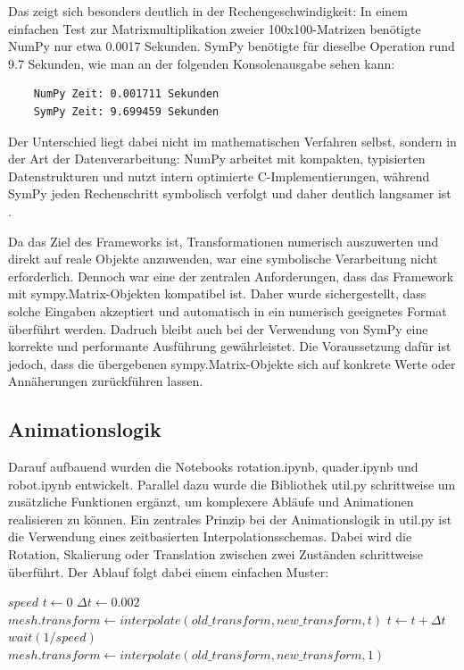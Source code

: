 Das zeigt sich besonders deutlich in der Rechengeschwindigkeit: In einem einfachen Test zur Matrixmultiplikation zweier 100x100-Matrizen benötigte NumPy nur etwa 0.0017
Sekunden. SymPy benötigte für dieselbe Operation rund 9.7 Sekunden, wie man an der folgenden Konsolenausgabe sehen kann:
\begin{center}
    \begin{verbatim}
    NumPy Zeit: 0.001711 Sekunden
    SymPy Zeit: 9.699459 Sekunden
    \end{verbatim}
\end{center}
Der Unterschied liegt dabei nicht im mathematischen Verfahren selbst,
sondern in der Art der Datenverarbeitung: NumPy arbeitet mit kompakten, typisierten Datenstrukturen und nutzt intern optimierte C-Implementierungen,
während SymPy jeden Rechenschritt symbolisch verfolgt und daher deutlich langsamer ist .

Da das Ziel des Frameworks ist, Transformationen numerisch auszuwerten und direkt auf reale Objekte anzuwenden,
war eine symbolische Verarbeitung nicht erforderlich. Dennoch war eine der zentralen Anforderungen, dass das Framework mit sympy.Matrix-Objekten kompatibel ist.
Daher wurde sichergestellt, dass solche Eingaben akzeptiert und automatisch in ein numerisch geeignetes Format überführt werden.
Dadruch bleibt auch bei der Verwendung von SymPy eine korrekte und performante Ausführung gewährleistet. Die Voraussetzung dafür ist jedoch,
dass die über\-gebenen sympy.Ma\-trix-Objekte sich auf konkrete Werte oder Annäherungen zurückführen lassen.

\subsection{Animationslogik}
Darauf aufbauend wurden die Notebooks rotation.ipynb, quader.ipynb und robot.ipynb entwickelt. Parallel dazu wurde die Bibliothek util.py
schrittweise um zusätzliche Funktionen ergänzt, um komplexere Abläufe und Animationen realisieren zu können.
Ein zentrales Prinzip bei der Animationslogik in util.py ist die Verwendung eines zeitbasierten Interpolationsschemas.
Dabei wird die Rotation, Skalierung oder Translation zwischen zwei Zuständen schrittweise überführt.
Der Ablauf folgt dabei einem einfachen Muster:

\begin{algorithm}
    \caption{Interpolation einer Transformation}
    \begin{algorithmic}[1]
    \State $speed$ 
    \State $t \gets 0$
    \State $\Delta t \gets 0.002$
        \State $mesh.transform \gets \mathit{interpolate}(old\_transform, new\_transform, t)$
        \State $t \gets t + \Delta t$
        \State $\mathit{wait}(1/speed)$
    \EndWhile
    \State $mesh.transform \gets \mathit{interpolate}(old\_transform, new\_transform, 1)$
    \end{algorithmic}
\end{algorithm}

